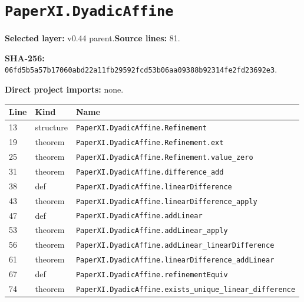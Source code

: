 \documentclass[10pt,oneside]{book}
\begin{document}
\section{\texorpdfstring{\nolinkurl{PaperXI.DyadicAffine}}{PaperXI.DyadicAffine}}\label{module:PaperXI.DyadicAffine}

\textbf{Selected layer:} v0.44 parent.\quad\textbf{Source lines:} 81.\par\textbf{SHA-256:} {\scriptsize\nolinkurl{06fd5b5a57b17060abd22a11fb29592fcd53b06aa09388b92314fe2fd23692e3}}.


\textbf{Direct project imports:} none.

\begin{longtable}{@{}p{}p{}p{}@{}}\toprule Line&Kind&Name\\\midrule\endhead

13&structure&\nolinkurl{PaperXI.DyadicAffine.Refinement}\\

19&theorem&\nolinkurl{PaperXI.DyadicAffine.Refinement.ext}\\

25&theorem&\nolinkurl{PaperXI.DyadicAffine.Refinement.value_zero}\\

31&theorem&\nolinkurl{PaperXI.DyadicAffine.difference_add}\\

38&def&\nolinkurl{PaperXI.DyadicAffine.linearDifference}\\

43&theorem&\nolinkurl{PaperXI.DyadicAffine.linearDifference_apply}\\

47&def&\nolinkurl{PaperXI.DyadicAffine.addLinear}\\

53&theorem&\nolinkurl{PaperXI.DyadicAffine.addLinear_apply}\\

56&theorem&\nolinkurl{PaperXI.DyadicAffine.addLinear_linearDifference}\\

61&theorem&\nolinkurl{PaperXI.DyadicAffine.linearDifference_addLinear}\\

67&def&\nolinkurl{PaperXI.DyadicAffine.refinementEquiv}\\

74&theorem&\nolinkurl{PaperXI.DyadicAffine.exists_unique_linear_difference}\\

\bottomrule\end{longtable}
\end{document}

